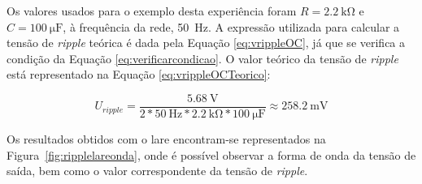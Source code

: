 Os valores usados para o exemplo desta experiência foram $R=\SI{2.2}{\kilo\ohm}$ e $C=\SI{100}{\micro\farad}$, à frequência da rede, \SI{50}{\hertz}. A expressão utilizada para calcular a tensão de \textit{ripple} teórica é dada pela Equação \ref{eq:vrippleOC}, já que se verifica a condição da Equação \ref{eq:verificarcondicao}. O valor teórico da tensão de \textit{ripple} está representado na Equação \ref{eq:vrippleOCTeorico}:

\begin{equation} \label{eq:vrippleOCTeorico}
	U_{ripple} = \frac{\SI{5.68}{\volt}}{2*\SI{50}{\hertz}*\SI{2.2}{\kilo\ohm}*\SI{100}{\micro\farad}} \approx \SI{258.2}{\milli\volt}
\end{equation}

Os resultados obtidos com o \acrshort{lare} encontram-se representados na Figura~\ref{fig:ripplelareonda}, onde é possível observar a forma de onda da tensão de saída, bem como o valor correspondente da tensão de \textit{ripple}. 

